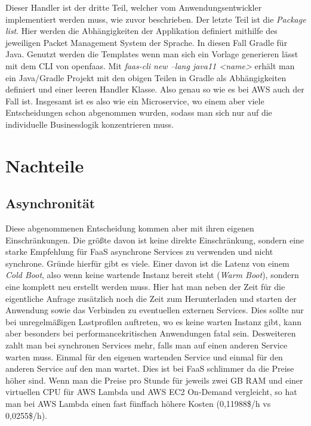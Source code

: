 \documentclass[12pt, a4paper]{article}
\begin{document}
Dieser Handler ist der dritte Teil, welcher vom Anwendungsentwickler implementiert werden muss, wie zuvor beschrieben.
\newline
Der letzte Teil ist die \emph{Package list}.
Hier werden die Abhängigkeiten der Applikation definiert mithilfe des jeweiligen Packet Management System der Sprache.
In diesen Fall Gradle für Java.
\newline
Genutzt werden die Templates wenn man sich ein Vorlage generieren lässt mit dem CLI von openfaas.
Mit \emph{faas-cli new --lang java11 <name>} erhält man ein Java/Gradle Projekt mit den obigen Teilen in Gradle als Abhängigkeiten definiert und einer leeren Handler Klasse.
Also genau so wie es bei \ac{AWS} auch der Fall ist.
\newline
Insgesamt ist es also wie ein Microservice, wo einem aber viele Entscheidungen schon abgenommen wurden, sodass man sich nur auf die individuelle Businesslogik konzentrieren muss.

\section{Nachteile}
\subsection{Asynchronität}
Diese abgenommenen Entscheidung kommen aber mit ihren eigenen Einschränkungen.
\newline
Die größte davon ist keine direkte Einschränkung, sondern eine starke Empfehlung für \ac{FaaS} asynchrone Services zu verwenden und nicht synchrone.
Gründe hierfür gibt es viele.
Einer davon ist die Latenz von einem \emph{Cold Boot}, also wenn keine wartende Instanz bereit steht (\emph{Warm Boot}), sondern eine komplett neu erstellt werden muss.
Hier hat man neben der Zeit für die eigentliche Anfrage zusätzlich noch die Zeit zum Herunterladen und starten der Anwendung sowie das Verbinden zu eventuellen externen Services.
Dies sollte nur bei unregelmäßigen Lastprofilen auftreten, wo es keine warten Instanz gibt, kann aber besonders bei performancekritischen Anwendungen fatal sein.
\newline
Desweiteren zahlt man bei synchronen Services mehr, falls man auf einen anderen Service warten muss.
Einmal für den eigenen wartenden Service und einmal für den anderen Service auf den man wartet.
Dies ist bei \ac{FaaS} schlimmer da die Preise höher sind.
Wenn man die Preise pro Stunde für jeweils zwei GB RAM und einer virtuellen CPU für AWS Lambda und AWS EC2 On-Demand vergleicht, so hat man bei AWS Lambda einen fast fünffach höhere Kosten (0,11988\$/h vs 0,0255\$/h).
\end{document}
